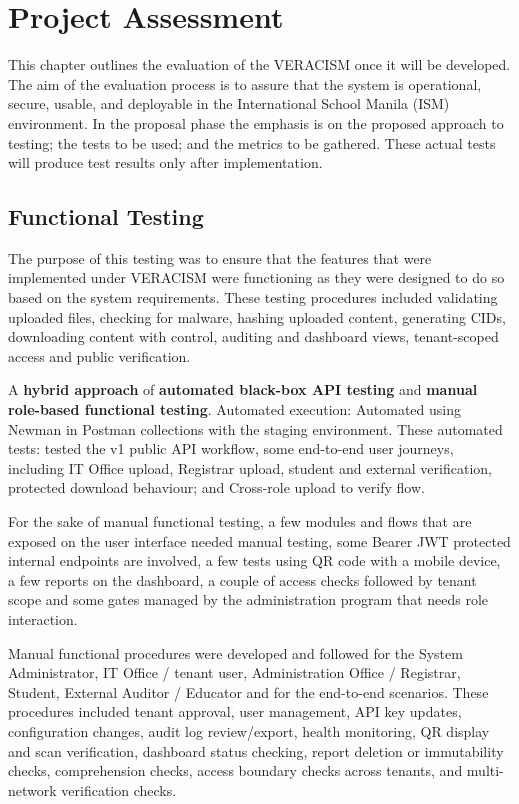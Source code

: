 \section{Project Assessment}

This chapter outlines the evaluation of the VERACISM once it will be developed. The aim of the evaluation process is to assure that the system is operational, secure, usable, and deployable in the International School Manila (ISM) environment. In the proposal phase the emphasis is on the proposed approach to testing; the tests to be used; and the metrics to be gathered. These actual tests will produce test results only after implementation.

\subsection{Functional Testing}

The purpose of this testing was to ensure that the features that were implemented under VERACISM were functioning as they were designed to do so based on the system requirements. These testing procedures included validating uploaded files, checking for malware, hashing uploaded content, generating CIDs, downloading content with control, auditing and dashboard views, tenant-scoped access and public verification.

A \textbf{hybrid approach} of
\textbf{automated black-box API testing} and \textbf{manual role-based
functional testing}. Automated execution: Automated using Newman in Postman collections with the staging environment. These automated tests: tested the v1 public API workflow, some end-to-end user journeys, including IT Office upload, Registrar upload, student and external verification, protected download behaviour; and Cross-role upload to verify flow.

For the sake of manual functional testing, a few modules and flows that are exposed on the user interface needed manual testing, some Bearer JWT protected internal endpoints are involved, a few tests using QR code with a mobile device, a few reports on the dashboard, a couple of access checks followed by tenant scope and some gates managed by the administration program that needs role interaction.

Manual functional procedures were developed and followed for the System Administrator, IT Office / tenant user, Administration Office / Registrar, Student, External Auditor / Educator and for the end-to-end scenarios. These procedures included tenant approval, user management, API key updates, configuration changes, audit log review/export, health monitoring, QR display and scan verification, dashboard status checking, report deletion or immutability checks, comprehension checks, access boundary checks across tenants, and multi-network verification checks.

